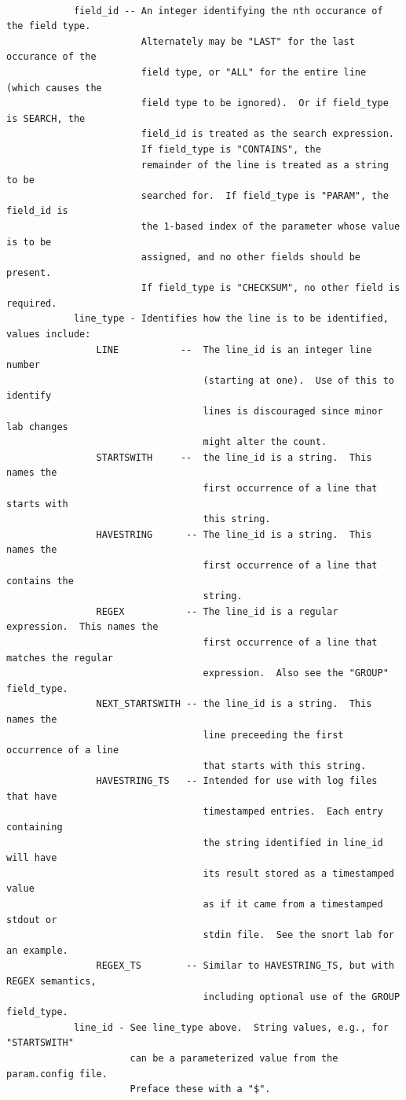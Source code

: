 \documentclass[12pt]{article}
\begin{document}
\begin{verbatim}
                              
            field_id -- An integer identifying the nth occurance of the field type.
                        Alternately may be "LAST" for the last occurance of the 
                        field type, or "ALL" for the entire line (which causes the 
                        field type to be ignored).  Or if field_type is SEARCH, the
                        field_id is treated as the search expression. 
                        If field_type is "CONTAINS", the 
                        remainder of the line is treated as a string to be 
                        searched for.  If field_type is "PARAM", the field_id is
                        the 1-based index of the parameter whose value is to be 
                        assigned, and no other fields should be present.
                        If field_type is "CHECKSUM", no other field is required.
            line_type - Identifies how the line is to be identified, values include:
                LINE           --  The line_id is an integer line number 
                                   (starting at one).  Use of this to identify 
                                   lines is discouraged since minor lab changes 
                                   might alter the count.
                STARTSWITH     --  the line_id is a string.  This names the 
                                   first occurrence of a line that starts with 
                                   this string. 
                HAVESTRING      -- The line_id is a string.  This names the 
                                   first occurrence of a line that contains the 
                                   string.
                REGEX           -- The line_id is a regular expression.  This names the 
                                   first occurrence of a line that matches the regular
                                   expression.  Also see the "GROUP" field_type.
                NEXT_STARTSWITH -- the line_id is a string.  This names the 
                                   line preceeding the first occurrence of a line 
                                   that starts with this string. 
                HAVESTRING_TS   -- Intended for use with log files that have 
                                   timestamped entries.  Each entry containing
                                   the string identified in line_id will have
                                   its result stored as a timestamped value
                                   as if it came from a timestamped stdout or 
                                   stdin file.  See the snort lab for an example.
                REGEX_TS        -- Similar to HAVESTRING_TS, but with REGEX semantics,
                                   including optional use of the GROUP field_type.
            line_id - See line_type above.  String values, e.g., for "STARTSWITH"
                      can be a parameterized value from the param.config file.
                      Preface these with a "$".
\end{verbatim}
\end{document}

